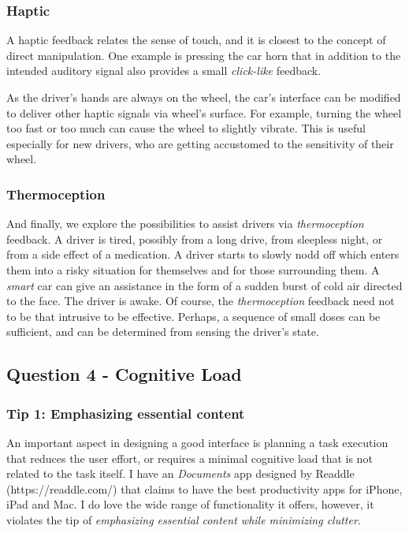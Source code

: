 \documentclass[12pt,letterpaper]{article}
\begin{document}
\subsubsection*{Haptic}
A haptic feedback relates the sense of touch, and it is closest to the concept of direct manipulation. One example is pressing the car horn that in addition to the intended auditory signal also provides a small \textit{click-like} feedback. 

As the driver's hands are always on the wheel, the car's interface can be modified to deliver other haptic signals via wheel's surface. For example, turning the wheel too fast or too much can cause the wheel to slightly vibrate. This is useful especially for new drivers, who are getting accustomed to the sensitivity of their wheel.

\subsubsection*{Thermoception}
And finally, we explore the possibilities to assist drivers via \textit{thermoception} feedback. A driver is tired, possibly from a long drive, from sleepless night, or from a side effect of a medication. A driver starts to slowly nodd off which enters them into a risky situation for themselves and for those surrounding them. A \textit{smart} car can give an assistance in the form of a sudden burst of cold air directed to the face. The driver is awake. Of course, the \textit{thermoception} feedback need not to be that intrusive to be effective. Perhaps, a sequence of small doses can be sufficient, and can be determined from sensing the driver's state. 

\subsection*{Question 4 - Cognitive Load}

\subsubsection*{Tip 1: Emphasizing essential content}
An important aspect in designing a good interface is planning a task execution that reduces the user effort, or requires a minimal cognitive load that is not related to the task itself. I have an \textit{Documents} app designed by Readdle (https://readdle.com/) that claims to have the best productivity apps for iPhone, iPad and Mac. I do love the wide range of functionality it offers, however, it violates the tip of \textit{emphasizing essential content while minimizing clutter}. 
\end{document}
